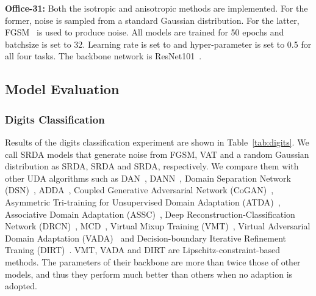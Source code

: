 \documentclass[journal,twocolumn]{IEEEtran}
\theoremstyle{definition}
\begin{document}
{\bf Office-31:}  Both the isotropic and anisotropic methods are implemented. For the former, noise is sampled from a standard Gaussian distribution. For the latter, FGSM~\cite{goodfellow2014explaining} is used to produce noise. All models are trained for 50 epochs and batchsize is set to 32. Learning rate is set to  and hyper-parameter  is set to 0.5 for all four tasks.  The backbone network is ResNet101~\cite{7780459}.

\subsection{Model Evaluation}

\subsubsection{Digits Classification}
Results of the digits classification experiment are shown in Table~\ref{tab:digits}. We call SRDA models that generate noise from FGSM, VAT and a random Gaussian distribution as SRDA, SRDA and SRDA, respectively.  We compare them with other UDA algorithms such as DAN~\cite{pmlr-v37-long15}, DANN~\cite{ganin2016domain}, Domain Separation Network (DSN)~\cite{NIPS2016_6254}, ADDA~\cite{tzeng2017adversarial}, Coupled Generative Adversarial Network (CoGAN)~\cite{liu2016coupled}, Asymmetric Tri-training for Unsupervised Domain Adaptation (ATDA)~\cite{pmlr-v70-saito17a}, Associative Domain Adaptation (ASSC)~\cite{Haeusser_2017_ICCV}, Deep Reconstruction-Classification Network (DRCN)~\cite{DBLP:conf/eccv/GhifaryKZBL16}, MCD~\cite{saito2018maximum}, Virtual Mixup Training (VMT)~\cite{mao2019virtual}, Virtual Adversarial Domain Adaptation (VADA)~\cite{shu2018a} and Decision-boundary Iterative Refinement Traning (DIRT)~\cite{shu2018a}. VMT, VADA and DIRT are Lipschitz-constraint-based methods. The parameters of their backbone are more than twice those of other models, and thus they perform much better than others when no adaption is adopted. 
\end{document}
